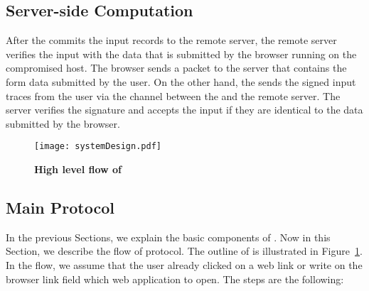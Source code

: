 \subsection{Server-side Computation}
\label{sec:systemDesign:serverSide}

After the \device commits the input records to the remote server, the remote server verifies the input with the data that is submitted by the browser running on the compromised host. The browser sends a \http packet to the server that contains the form data submitted by the user. On the other hand, the \device sends the signed input traces from the user via the \tls channel between the \device and the remote server. The server verifies the signature and accepts the input if they are identical to the data submitted by the browser.

\begin{figure}[t]
\centering
\texttt{[image: systemDesign.pdf]}
\caption{\textbf{High level flow of \name}}
\label{fig:systemDesign}
\centering
\end{figure}

\subsection{Main Protocol}
\label{sec:systemDesign:mainProtocol}

In the previous Sections, we explain the basic components of \name. Now in this Section, we describe the flow of \name protocol. The outline of \name is illustrated in Figure~\ref{fig:systemDesign}. In the flow, we assume that the user already clicked on a web link or write on the browser link field which web application to open. The steps are the following:


